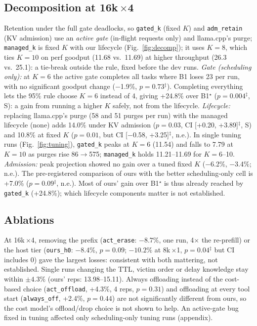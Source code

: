 \documentclass[conference]{IEEEtran}
\newcommand{\K}{$K$}
\newcommand{\x}{$\times$}
\newcommand{\pick}{$^\star$}
\newcommand{\calc}{$^\ddagger$}
\newcommand{\cfg}[1]{\texttt{#1}}
\begin{document}
\subsection{Decomposition at \texorpdfstring{16k\,\x4}{16k x4}}
Retention under the full gate deadlocks, so \cfg{gated\_k} (fixed \K) and \cfg{adm\_retain} (KV
admission) use an \emph{active gate} (in-flight requests only) and llama.cpp's purge;
\cfg{managed\_k} is fixed \K{} with our lifecycle (Fig.~\ref{fig:decomp}); it uses $K{=}8$, which
ties $K{=}10$ on perf goodput (11.68 vs.\ 11.69) at higher throughput (26.3 vs.\ 25.1): a tie-break
outside the rule, fixed before the dev runs. \emph{Gate (scheduling only):} at
$K{=}6$ the active gate completes all tasks where B1 loses 23 per run, with no significant goodput
change ($-$1.9\%, $p=0.73$\calc). Completing everything lets the 95\% rule choose $K{=}6$ instead of
4, giving +24.8\% over B1\pick{} ($p=0.004$\calc, S): a gain from running a higher \K{} safely, not
from the lifecycle. \emph{Lifecycle:} replacing llama.cpp's purge (58 and 51 purges per run) with
the managed lifecycle (none) adds 14.0\% under KV admission ($p=0.03$, CI [+0.20, +3.89]\calc, S)
and 10.8\% at fixed \K{} ($p=0.01$, but CI [$-$0.58, +3.25]\calc, n.e.). In single tuning runs
(Fig.~\ref{fig:tuning}), \cfg{gated\_k} peaks at $K{=}6$ (11.54) and falls to 7.79 at $K{=}10$ as
purges rise 86$\rightarrow$575; \cfg{managed\_k} holds 11.21--11.69 for $K{=}6$--10. \emph{Admission:} peak projection showed no gain over a tuned fixed \K{} ($-$6.2\%,
$-$3.4\%; n.e.). The pre-registered comparison of ours with the better scheduling-only cell is
+7.0\% ($p=0.09$\calc, n.e.). Most of ours' gain over B1\pick{} is thus already reached by \cfg{gated\_k}
(+24.8\%); which lifecycle components matter is not established.

\subsection{Ablations}\label{sec:abl}
At 16k\,\x4, removing the prefix (\cfg{act\_erase}: $-8.7\%$, one run, 4\x{} the re-prefill) or the
host tier (\cfg{ours\_h0}: $-8.4\%$, $p=0.09$; $-10.2\%$ at 8k\,\x1, $p=0.04$\calc{} but CI includes 0)
gave the largest losses: consistent with both mattering, not established. Single runs changing the
TTL, victim order or delay knowledge stay within $\pm4.3\%$ (ours' reps: 13.98--15.11).
Always offloading instead of the cost-based choice (\cfg{act\_offload}, +4.3\%, 4 reps, $p=0.31$)
and offloading at every tool start (\cfg{always\_off}, +2.4\%, $p=0.44$) are not significantly
different from ours, so the cost model's offload/drop choice is not shown to help. An active-gate bug fixed in tuning
affected only scheduling-only tuning runs (appendix).
\end{document}
